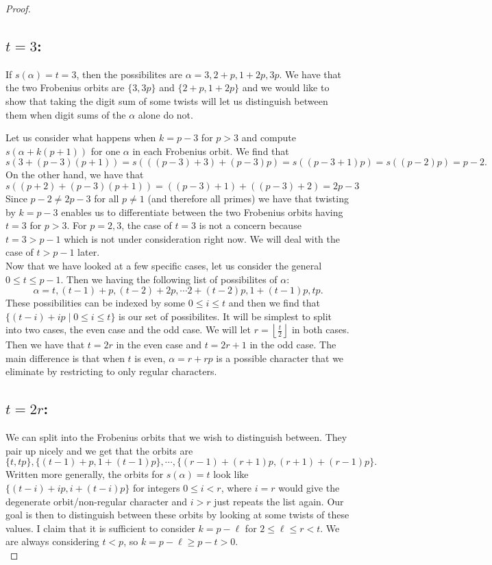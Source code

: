 \documentclass[12pt]{article}
\theoremstyle{customtheorem}%
\theoremstyle{remark}
\theoremstyle{definition}
\numberwithin{equation}{section}
\numberwithin{theorem}{section}
\begin{document}
\begin{proof}
\subsection{$t = 3$:} If $s(\alpha) = t= 3$, then the possibilites are $\alpha = 3,2+p,1+2p,3p$. 
We have that the two Frobenius orbits are $\{3,3p\}$ and $\{2+p, 1+2p\}$ and we would like to show that taking the digit sum of some twists will let us distinguish between them when digit sums of the $\alpha$ alone do not.

Let us consider what happens when $k = p-3$ for $p > 3$ and compute $s(\alpha + k(p+1))$ for one $\alpha$ in each Frobenius orbit. 
We find that \[s(3 + (p-3)(p+1)) = s(((p-3)+3)+(p-3)p) = s((p-3+1)p) = s((p-2)p) = p-2.\] 
On the other hand, we have that \[s((p+2)+(p-3)(p+1)) = ((p-3)+1) + ((p-3)+2) =2p-3\]
Since $p-2 \neq 2p-3$ for all $p \neq 1$ (and therefore all primes) we have that twisting by $k = p-3$ enables us to differentiate between the two Frobenius orbits having $t = 3$ for $p > 3$. 
For $p = 2,3$, the case of $t = 3$ is not a concern because $t =3 > p-1$ which is not under consideration right now. 
We will deal with the case of $t > p-1$ later.
\\

Now that we have looked at a few specific cases, let us consider the general $0 \leq t \leq p-1$. 
Then we having the following list of possibilites of $\alpha$: \[\alpha = t, (t-1) + p, (t-2) +2 p, \cdots 2 + (t-2)p , 1 + (t-1)p, tp.\] 
These possibilities can be indexed by some $0 \leq i \leq t$ and then we find that $\{ (t-i) + i p \mid 0 \leq i \leq t\}$ is our set of possibilites. 
It will be simplest to split into two cases, the even case and the odd case.
We will let $r = \left\lfloor \frac{t}{2} \right\rfloor$ in both cases.
Then we have that $t = 2r$ in the even case and $t = 2r+1$ in the odd case.
The main difference is that when $t$ is even, $\alpha = r + rp$ is a possible character that we eliminate by restricting to only regular characters.

\subsection{$t = 2r$:}
We can split into the Frobenius orbits that we wish to distinguish between. 
They pair up nicely and we get that the orbits are \[\{t, tp\}, \{(t-1)+p, 1+(t-1)p\}, \cdots, \{(r-1) + (r+1) p, (r+1) + (r-1) p\}.\] 
Written more generally, the orbits for $s(\alpha) = t$ look like $\{(t-i) + ip, i + (t-i)p\}$ for integers $0 \leq i < r $, where $i=r$ would give the degenerate orbit/non-regular character and $i > r$ just repeats the list again. 
Our goal is then to distinguish between these orbits by looking at some twists of these values.
I claim that it is sufficient to consider $k = p - \ell$ for $2 \leq \ell \leq r < t$.
We are always considering $t < p$, so $k = p - \ell \geq p - t > 0$.
\\


\end{proof}
\end{document}
